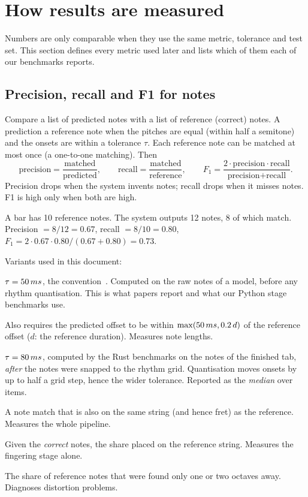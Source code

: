 \section{How results are measured}
\label{sec:eval}

Numbers are only comparable when they use the same metric, tolerance and test
set. This section defines every metric used later and lists which of them each
of our benchmarks reports.

\subsection{Precision, recall and F1 for notes}

Compare a list of predicted notes with a list of reference (correct) notes. A
prediction  a reference note when the pitches are equal (within
half a semitone) and the onsets are within a tolerance $\tau$. Each reference
note can be matched at most once (a one-to-one matching). Then
\[
  \text{precision} = \frac{\text{matched}}{\text{predicted}},\qquad
  \text{recall} = \frac{\text{matched}}{\text{reference}},\qquad
  F_1 = \frac{2\cdot\text{precision}\cdot\text{recall}}{\text{precision}+\text{recall}}.
\]
Precision drops when the system invents notes; recall drops when it misses
notes. F1 is high only when both are high.

\begin{worked}[: F1]
A bar has 10 reference notes. The system outputs 12 notes, 8 of which match.
Precision $= 8/12 = 0.67$, recall $= 8/10 = 0.80$,
$F_1 = 2\cdot0.67\cdot0.80/(0.67+0.80) = 0.73$.
\end{worked}

Variants used in this document:
\begin{description}[style=nextline,leftmargin=1.2cm]
\item[F50 (onset F1)] $\tau = 50\,ms$, the 
  convention~\cite{raffel2014mireval,hawthorne2018onsets}. Computed on the raw
  notes of a model, before any rhythm quantisation. This is what papers report
  and what our Python stage benchmarks use.
\item[Onset-offset F1] Also requires the predicted offset to be within
  $\max(50\,ms, 0.2\,d)$ of the reference offset ($d$: the reference duration).
  Measures note lengths.
\item[Final-tab F1 (ours)] $\tau = 80\,ms$, computed by the Rust benchmarks on the
  notes of the finished tab, \emph{after} the notes were snapped to the rhythm
  grid. Quantisation moves onsets by up to half a grid step, hence the wider
  tolerance. Reported as the \emph{median} over items.
\item[Tab F1] A note match that is also on the same string (and hence fret) as
  the reference. Measures the whole pipeline.
\item[String accuracy] Given the \emph{correct} notes, the share placed on the
  reference string. Measures the fingering stage alone.
\item[Octave errors] The share of reference notes that were found only one or two
  octaves away. Diagnoses distortion problems.
\end{description}


